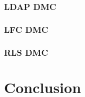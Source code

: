 \documentclass{book}
\begin{document}
\subsection{LDAP DMC}


\subsection{LFC DMC}


\subsection{RLS DMC}


\chapter{Conclusion}


\end{document}
